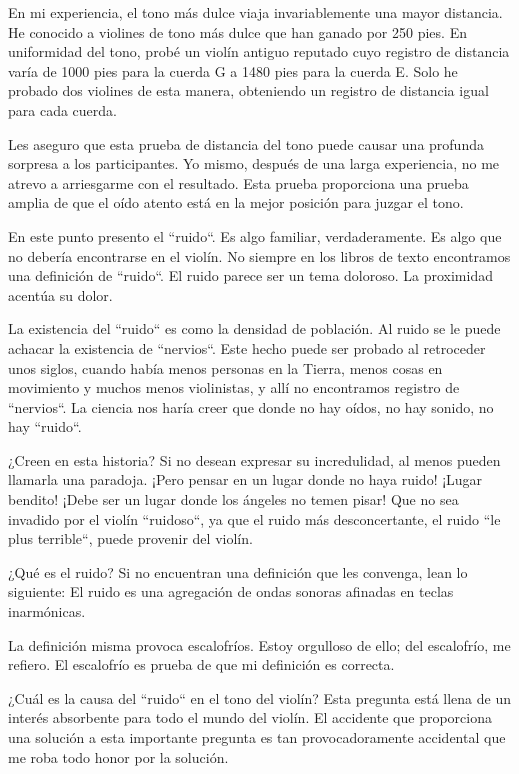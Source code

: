 \documentclass[12pt]{book}
\begin{document}
En mi experiencia, el tono más dulce viaja invariablemente una mayor distancia. He conocido a violines de tono más dulce que han ganado por 250 pies. En uniformidad del tono, probé un violín antiguo reputado cuyo registro de distancia varía de 1000 pies para la cuerda G a 1480 pies para la cuerda E. Solo he probado dos violines de esta manera, obteniendo un registro de distancia igual para cada cuerda.

Les aseguro que esta prueba de distancia del tono puede causar una profunda sorpresa a los participantes. Yo mismo, después de una larga experiencia, no me atrevo a arriesgarme con el resultado. Esta prueba proporciona una prueba amplia de que el oído atento está en la mejor posición para juzgar el tono.

En este punto presento el ``ruido``. 
Es algo familiar, verdaderamente. 
Es algo que no debería encontrarse en el violín. 
No siempre en los libros de texto encontramos una definición de ``ruido``. 
El ruido parece ser un tema doloroso. La proximidad acentúa su dolor.

La existencia del ``ruido`` es como la densidad de población. Al ruido se le puede achacar la existencia de ``nervios``. Este hecho puede ser probado al retroceder unos siglos, cuando había menos personas en la Tierra, menos cosas en movimiento y muchos menos violinistas, y allí no encontramos registro de ``nervios``. La ciencia nos haría creer que donde no hay oídos, no hay sonido, no hay ``ruido``.

¿Creen en esta historia? Si no desean expresar su incredulidad, al menos pueden llamarla una paradoja. ¡Pero pensar en un lugar donde no haya ruido! ¡Lugar bendito! ¡Debe ser un lugar donde los ángeles no temen pisar! Que no sea invadido por el violín ``ruidoso``, ya que el ruido más desconcertante, el ruido ``le plus terrible``, puede provenir del violín.

¿Qué es el ruido? Si no encuentran una definición que les convenga, lean lo siguiente: El ruido es una agregación de ondas sonoras afinadas en teclas inarmónicas.

La definición misma provoca escalofríos. Estoy orgulloso de ello; del escalofrío, me refiero. El escalofrío es prueba de que mi definición es correcta.

¿Cuál es la causa del ``ruido`` en el tono del violín? Esta pregunta está llena de un interés absorbente para todo el mundo del violín. El accidente que proporciona una solución a esta importante pregunta es tan provocadoramente accidental que me roba todo honor por la solución.
\end{document}
